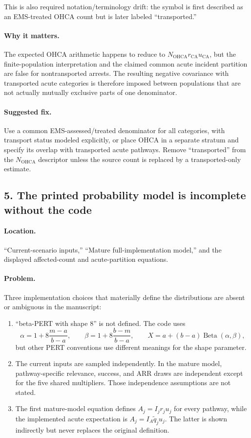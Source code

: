 \documentclass[11pt]{article}
\begin{document}
This is also required notation/terminology drift: the symbol is first
described as an EMS-treated OHCA count but is later labeled ``transported.''

\paragraph{Why it matters.}
The expected OHCA arithmetic happens to reduce to
$N_{\mathrm{OHCA}}r_{\mathrm{CA}}u_{\mathrm{CA}}$, but the finite-population
interpretation and the claimed common acute incident partition are false for
nontransported arrests.  The resulting negative covariance with transported
acute categories is therefore imposed between populations that are not
actually mutually exclusive parts of one denominator.

\paragraph{Suggested fix.}
Use a common EMS-assessed/treated denominator for all categories, with
transport status modeled explicitly, or place OHCA in a separate stratum and
specify its overlap with transported acute pathways.  Remove ``transported''
from the $N_{\mathrm{OHCA}}$ descriptor unless the source count is replaced by
a transported-only estimate.

\subsection*{5. The printed probability model is incomplete without the code}

\paragraph{Location.}
``Current-scenario inputs,'' ``Mature full-implementation model,'' and the
displayed affected-count and acute-partition equations.

\paragraph{Problem.}
Three implementation choices that materially define the distributions are
absent or ambiguous in the manuscript:
\begin{enumerate}
\item ``beta-PERT with shape 8'' is not defined.  The code uses
\[
\alpha=1+8\frac{m-a}{b-a},\qquad
\beta=1+8\frac{b-m}{b-a},\qquad
X=a+(b-a)\operatorname{Beta}(\alpha,\beta),
\]
but other PERT conventions use different meanings for the shape parameter.
\item The current inputs are sampled independently.  In the mature model,
pathway-specific relevance, success, and ARR draws are independent except for
the five shared multipliers.  Those independence assumptions are not stated.
\item The first mature-model equation defines $A_j=I_jr_ju_j$ for every pathway, while
the implemented acute expectation is $A_j=I_A\tilde q_ju_j$.  The latter is
shown indirectly but never replaces the original definition.
\end{enumerate}
\end{document}
